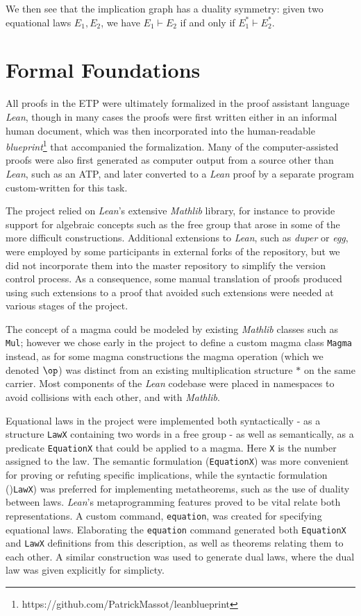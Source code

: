 We then see that the implication graph has a duality symmetry: given two equational laws $E_1,E_2$, we have $E_1 \vdash E_2$ if and only if $E_1^* \vdash E_2^*$.

\section{Formal Foundations}


All proofs in the ETP were ultimately formalized in the proof assistant language \emph{Lean}, though in many cases the proofs were first written either in an informal human document, which was then incorporated into the human-readable \emph{blueprint}\footnote{https://github.com/PatrickMassot/leanblueprint} that accompanied the formalization.  Many of the computer-assisted proofs were also first generated as computer output from a source other than \emph{Lean}, such as an ATP, and later converted to a \emph{Lean} proof by a separate program custom-written for this task.

The project relied on \emph{Lean}'s extensive \emph{Mathlib} library, for instance to provide support for algebraic concepts such as the free group that arose in some of the more difficult constructions.  Additional extensions to \emph{Lean}, such as \emph{duper} or \emph{egg}, were employed by some participants in external forks of the repository, but we did not incorporate them into the master repository to simplify the version control process.  As a consequence, some manual translation of proofs produced using such extensions to a proof that avoided such extensions were needed at various stages of the project.

The concept of a magma could be modeled by existing \emph{Mathlib} classes such as \texttt{Mul}; however we chose early in the project to define a custom magma class \texttt{Magma} instead, as for some magma constructions the magma operation (which we denoted $\op$) was distinct from an existing multiplication structure $*$ on the same carrier.  Most components of the \emph{Lean} codebase were placed in namespaces to avoid collisions with each other, and with \emph{Mathlib}.

Equational laws in the project were implemented both syntactically - as a structure \texttt{LawX} containing two words in a free group - as well as semantically, as a predicate \texttt{EquationX} that could be applied to a magma. Here \texttt{X} is the number assigned to the law. The semantic formulation (\texttt{EquationX}) was more convenient for proving or refuting specific implications, while the syntactic formulation ()\texttt{LawX}) was preferred for implementing metatheorems, such as the use of duality between laws. \emph{Lean}'s metaprogramming features proved to be vital relate both representations. A custom command, \texttt{equation}, was created for specifying equational laws. Elaborating the \texttt{equation} command generated both \texttt{EquationX} and \texttt{LawX} definitions from this description, as well as theorems relating them to each other. A similar construction was used to generate dual laws, where the dual law was given explicitly for simplicty.

